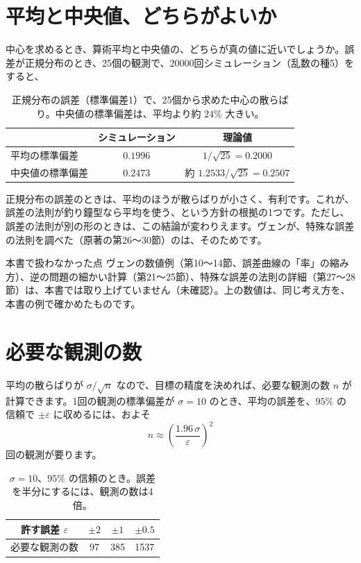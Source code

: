 \documentclass[a4paper,11pt,openany]{ltjsbook}
\begin{document}
\section{平均と中央値、どちらがよいか}

中心を求めるとき、算術平均と中央値の、どちらが真の値に近いでしょうか。誤差が正規分布のとき、25個の観測で、20000回シミュレーション（乱数の種5）をすると、

\begin{table}[htbp]
\centering
\begin{tabular}{lcc}
\toprule
 & シミュレーション & 理論値\\
\midrule
平均の標準偏差 & $0.1996$ & $1/\sqrt{25}=0.2000$\\
中央値の標準偏差 & $0.2473$ & 約 $1.2533/\sqrt{25}=0.2507$\\
\bottomrule
\end{tabular}
\caption{正規分布の誤差（標準偏差1）で、25個から求めた中心の散らばり。中央値の標準偏差は、平均より約 $24\%$ 大きい。}
\end{table}

正規分布の誤差のときは、平均のほうが散らばりが小さく、有利です。これが、誤差の法則が釣り鐘型なら平均を使う、という方針の根拠の1つです。ただし、誤差の法則が別の形のときは、この結論が変わりえます。ヴェンが、特殊な誤差の法則を調べた（原著の第26〜30節）のは、そのためです。

\begin{notebox}{本書で扱わなかった点}
ヴェンの数値例（第10〜14節、誤差曲線の「率」の縮み方）、逆の問題の細かい計算（第21〜25節）、特殊な誤差の法則の詳細（第27〜28節）は、本書では取り上げていません（未確認）。上の数値は、同じ考え方を、本書の例で確かめたものです。
\end{notebox}

\section{必要な観測の数}

平均の散らばりが $\sigma/\sqrt n$ なので、目標の精度を決めれば、必要な観測の数 $n$ が計算できます。1回の観測の標準偏差が $\sigma=10$ のとき、平均の誤差を、$95\%$ の信頼で $\pm\varepsilon$ に収めるには、およそ
\[
n\approx\left(\frac{1.96\,\sigma}{\varepsilon}\right)^2
\]
回の観測が要ります。

\begin{table}[htbp]
\centering
\begin{tabular}{c|ccc}
\toprule
許す誤差 $\varepsilon$ & $\pm2$ & $\pm1$ & $\pm0.5$\\
\midrule
必要な観測の数 & 97 & 385 & 1537\\
\bottomrule
\end{tabular}
\caption{$\sigma=10$、$95\%$ の信頼のとき。誤差を半分にするには、観測の数は4倍。}
\end{table}
\end{document}
